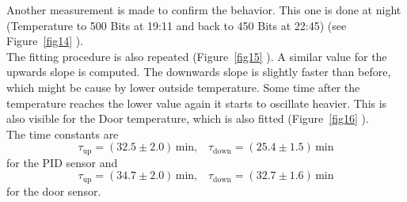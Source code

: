 \documentclass[12pt]{scrartcl}
\begin{document}
      Another measurement is made to confirm the behavior. This one is done at
      night (Temperature to 500 Bits at 19:11 and back to 450 Bits at 22:45)
      (see Figure~\ref{fig14} ). \\ The fitting procedure is also repeated
      (Figure~\ref{fig15} ). A similar value for the upwards slope is computed. The
      downwards slope is slightly faster than before, which might be cause by
      lower outside temperature. Some time after the
      temperature reaches the lower value again it starts to oscillate heavier.
      This is also visible for the Door temperature, which is also fitted
      (Figure~\ref{fig16} ). \\
      The time constants are
      $$\tau_{\text{up}} = (32.5 \pm 2.0)\,\text{min}, \;\;\; \tau_{\text{down}} =
      (25.4 \pm 1.5) \,\text{min}$$
      for the PID sensor and
      $$\tau_{\text{up}} = (34.7 \pm 2.0) \,\text{min}, \;\;\;
      \tau_{\text{down}} = (32.7 \pm 1.6) \,\text{min}$$
      for the door sensor.
\end{document}
